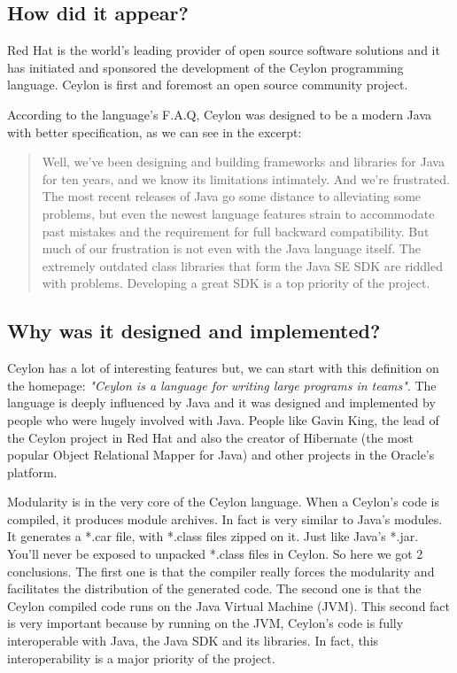 \subsection{How did it appear?}

Red Hat\cite{1_1} is the world's leading provider of open source software
solutions and it has initiated and sponsored\cite{1_2} the development
of the Ceylon programming language. Ceylon is first and foremost an open source
community project.

According to the language's F.A.Q\cite{1_3}, Ceylon was designed to be a
modern Java with better specification, as we can see in the excerpt:

\begin{quote}
Well, we've been designing and building frameworks and libraries for Java for
ten years, and we know its limitations intimately. And we're frustrated. The
most recent releases of Java go some distance to alleviating some problems,
but even the newest language features strain to accommodate past mistakes and
the requirement for full backward compatibility.
But much of our frustration is not even with the Java language itself. The
extremely outdated class libraries that form the Java SE SDK are riddled with
problems. Developing a great SDK is a top priority of the project.
\end{quote}

\subsection{Why was it designed and implemented?}

Ceylon has a lot of interesting features but, we can start with this
definition on the homepage\cite{1_4}: \textit{"Ceylon is a language for writing
large programs in teams"}. The language is deeply influenced by Java and it was
designed and implemented by people who were hugely involved with Java. People
like Gavin King, the lead of the Ceylon project in Red Hat and also the creator
of Hibernate\cite{1_5} (the most popular Object Relational Mapper for Java) and
other projects in the Oracle's platform.

Modularity is in the very core of the Ceylon language. When a Ceylon's code is
compiled, it produces module archives. In fact is very similar to Java's
modules. It generates a *.car file, with *.class files zipped on it. Just
like Java's *.jar. You'll never be exposed to unpacked *.class files in
Ceylon. So here we got 2 conclusions. The first one is that the compiler
really forces the modularity and facilitates the distribution of the generated
code. The second one is that the Ceylon compiled code runs on the Java Virtual
Machine (JVM). This second fact is very important because by running on the JVM,
Ceylon's code is fully interoperable with Java, the Java SDK and its libraries.
In fact, this interoperability is a major priority of the project.

